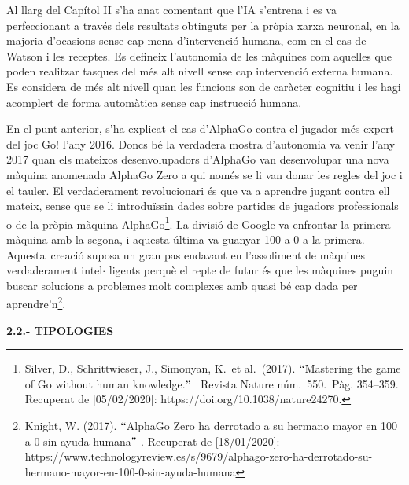 \documentclass[12pt]{article}
\begin{document}
\vspace{\baselineskip}
\begin{justify}
Al llarg del Capítol II s’ha anat comentant que l’IA s’entrena i es va perfeccionant a través dels resultats obtinguts per la pròpia xarxa neuronal, en la majoria d’ocasions sense cap mena d’intervenció humana, com en el cas de Watson i les receptes. Es defineix l’autonomia de les màquines com aquelles que poden realitzar tasques del més alt nivell sense cap intervenció externa humana. Es considera de més alt nivell quan les funcions son de caràcter cognitiu i les hagi acomplert de forma automàtica sense cap instrucció humana.
\end{justify}\par


\vspace{\baselineskip}
\begin{justify}
En el punt anterior, s’ha explicat el cas d’AlphaGo contra el jugador més expert del joc Go! l’any 2016. Doncs bé la verdadera mostra d’autonomia va venir l’any 2017 quan els mateixos desenvolupadors d’AlphaGo van desenvolupar una nova màquina anomenada AlphaGo Zero a qui només se li van donar les regles del joc i el tauler. El verdaderament revolucionari és que va a aprendre jugant contra ell mateix, sense que se li introduïssin dades sobre partides de jugadors professionals o de la pròpia màquina AlphaGo\footnote{ Silver, D., Schrittwieser, J., Simonyan, K. et al. (2017). $``$Mastering the game of Go without human knowledge.$"$  Revista Nature núm. 550. Pàg. 354–359. Recuperat de [05/02/2020]: https://doi.org/10.1038/nature24270.  }. La divisió de Google va enfrontar la primera màquina amb la segona, i aquesta última va guanyar 100 a 0 a la primera.  Aquesta\ creació suposa un gran pas endavant  en l’assoliment de màquines verdaderament intel$ \cdot $ ligents perquè el repte de futur és que les màquines puguin buscar solucions a problemes molt complexes amb quasi bé cap dada per aprendre’n\footnote{ Knight, W. (2017). $``$AlphaGo Zero ha derrotado a su hermano mayor en 100 a 0 sin ayuda humana$"$ .  Recuperat de [18/01/2020]: https://www.technologyreview.es/s/9679/alphago-zero-ha-derrotado-su-hermano-mayor-en-100-0-sin-ayuda-humana }. 
\end{justify}\par


\vspace{\baselineskip}
\begin{justify}
\textbf{2.2.- TIPOLOGIES}
\end{justify}\par
\end{document}
